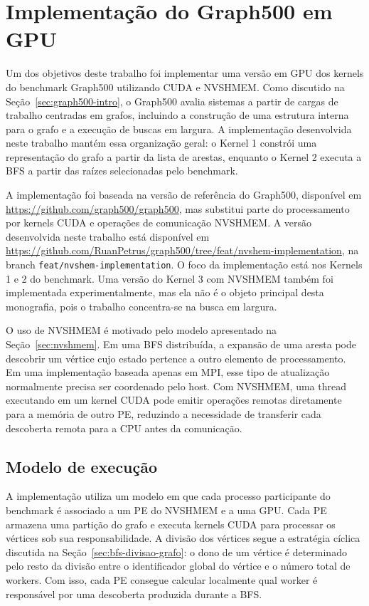 \section{Implementação do Graph500 em GPU}
Um dos objetivos deste trabalho foi implementar uma versão em GPU dos kernels do
benchmark Graph500 utilizando CUDA e NVSHMEM. Como discutido na
Seção~\ref{sec:graph500-intro}, o Graph500 avalia sistemas a partir de cargas de
trabalho centradas em grafos, incluindo a construção de uma estrutura interna para
o grafo e a execução de buscas em largura. A implementação desenvolvida neste
trabalho mantém essa organização geral: o Kernel 1 constrói uma representação do
grafo a partir da lista de arestas, enquanto o Kernel 2 executa a BFS a partir
das raízes selecionadas pelo benchmark.

A implementação foi baseada na versão de referência do Graph500, disponível em
\url{https://github.com/graph500/graph500}, mas substitui parte do processamento
por kernels CUDA e operações de comunicação NVSHMEM. A versão desenvolvida neste
trabalho está disponível em
\url{https://github.com/RuanPetrus/graph500/tree/feat/nvshem-implementation}, na
branch \texttt{feat/nvshem-implementation}. O foco da implementação está nos
Kernels 1 e 2 do benchmark. Uma versão do Kernel 3 com NVSHMEM também foi
implementada experimentalmente, mas ela não é o objeto principal desta
monografia, pois o trabalho concentra-se na busca em largura.

O uso de NVSHMEM é motivado pelo modelo apresentado na Seção~\ref{sec:nvshmem}.
Em uma BFS distribuída, a expansão de uma aresta pode descobrir um vértice cujo
estado pertence a outro elemento de processamento. Em uma implementação baseada
apenas em MPI, esse tipo de atualização normalmente precisa ser coordenado pelo
host. Com NVSHMEM, uma thread executando em um kernel CUDA pode emitir operações
remotas diretamente para a memória de outro PE, reduzindo a necessidade de
transferir cada descoberta remota para a CPU antes da comunicação.

\subsection{Modelo de execução}

A implementação utiliza um modelo em que cada processo participante do benchmark
é associado a um PE do NVSHMEM e a uma GPU. Cada PE armazena uma partição do
grafo e executa kernels CUDA para processar os vértices sob sua responsabilidade.
A divisão dos vértices segue a estratégia cíclica discutida na
Seção~\ref{sec:bfs-divisao-grafo}: o dono de um vértice é determinado pelo resto
da divisão entre o identificador global do vértice e o número total de workers.
Com isso, cada PE consegue calcular localmente qual worker é responsável por uma
descoberta produzida durante a BFS.

